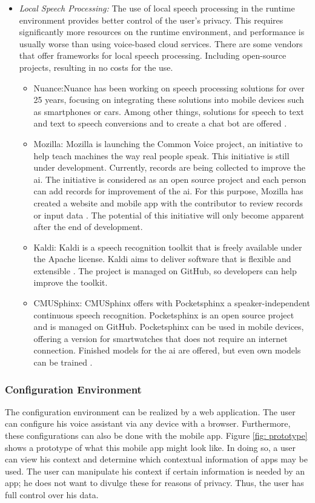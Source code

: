 \begin{itemize}
\begin{itemize}
	\end{itemize}
	\item \textsl{Local Speech Processing:} The use of local speech processing in the runtime environment provides better control of the user's privacy. This requires significantly more resources on the runtime environment, and performance is usually worse than using voice-based cloud services. There are some vendors that offer frameworks for local speech processing. Including open-source projects, resulting in no costs for the use.
	\begin{itemize}
		\item Nuance:Nuance has been working on speech processing solutions for over 25 years, focusing on integrating these solutions into mobile devices such as smartphones or cars. Among other things, solutions for speech to text and text to speech conversions and to create a chat bot are offered \cite{Nuance}. 
		\item Mozilla: Mozilla is launching the Common Voice project, an initiative to help teach machines the way real people speak. This initiative is still under development. Currently, records are being collected to improve the \ac{ai}. The initiative is considered as an open source project and each person can add records for improvement of the \ac{ai}. For this purpose, Mozilla has created a website and mobile app with the contributor to review records or input data \cite{MozillaCommonVoice}. The potential of this initiative will only become apparent after the end of development.
		\item Kaldi: Kaldi is a speech recognition toolkit that is freely available under the Apache license. Kaldi aims to deliver software that is flexible and extensible \cite{Kaldi}. The project is managed on GitHub, so developers can help improve the toolkit.
		\item CMUSphinx: CMUSphinx offers with Pocketsphinx a speaker-independent continuous speech recognition. Pocketsphinx is an open source project and is managed on GitHub. Pocketsphinx can be used in mobile devices, offering a version for smartwatches that does not require an internet connection. Finished models for the \ac{ai} are offered, but even own models can be trained \cite{Pocketsphinx}.
	\end{itemize}
\end{itemize}

\subsubsection{Configuration Environment}
The configuration environment can be realized by a web application. The user can configure his voice assistant via any device with a browser. Furthermore, these configurations can also be done with the mobile app. Figure \ref{fig: prototype} shows a prototype of what this mobile app might look like. In doing so, a user can view his context and determine which contextual information of apps may be used. The user can manipulate his context if certain information is needed by an app; he does not want to divulge these for reasons of privacy. Thus, the user has full control over his data.

